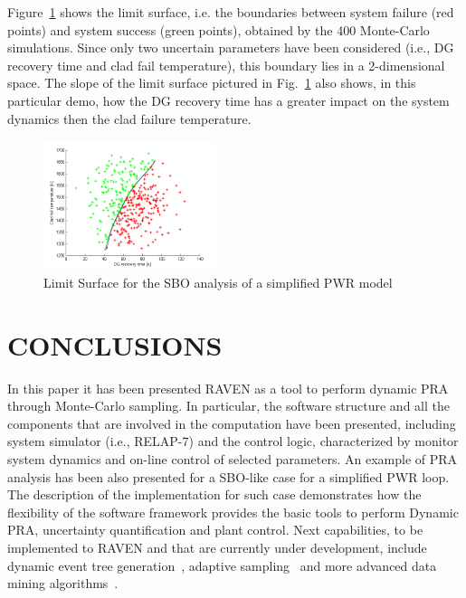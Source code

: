 \documentclass{anstrans}
\begin{document}
Figure~\ref{fig:limit_surface_rng_temp_and_dg} shows the limit surface, i.e. the boundaries between system failure (red points) and system success (green points), obtained by the 400 Monte-Carlo simulations. Since only two uncertain parameters have been considered (i.e., DG recovery time and clad fail temperature), this boundary lies in a 2-dimensional space.
The slope of the limit surface pictured in Fig.~\ref{fig:limit_surface_rng_temp_and_dg} also shows, in this particular demo, how the DG recovery time has a greater impact on the system dynamics then the clad failure temperature.
\begin{figure}
   \centering
    \includegraphics[width=0.45\textwidth]{figures/PRA_limitSurface.png}
    \caption{Limit Surface for the SBO analysis of a simplified PWR model}
    \label{fig:limit_surface_rng_temp_and_dg}
\end{figure}
\section{CONCLUSIONS}
In this paper it has been presented RAVEN as a tool to perform dynamic PRA through Monte-Carlo sampling. In particular, the software structure and all the components that are involved in the computation have been presented, including system simulator (i.e., RELAP-7) and the control logic, characterized by monitor system dynamics and on-line control of selected parameters.
An example of PRA analysis has been also presented for a SBO-like case for a simplified PWR loop. 
The description of the implementation for such case demonstrates how the flexibility of the software framework provides the basic tools to perform Dynamic PRA, uncertainty quantification and plant control. 
Next capabilities, to be implemented to RAVEN and that are currently under development, include dynamic event tree generation~\cite{ADAPTHakobyan}, adaptive sampling~\cite{mandelliSVMANS} and more advanced data mining algorithms~\cite{mandelliEsrel2011}. 




\end{document}
